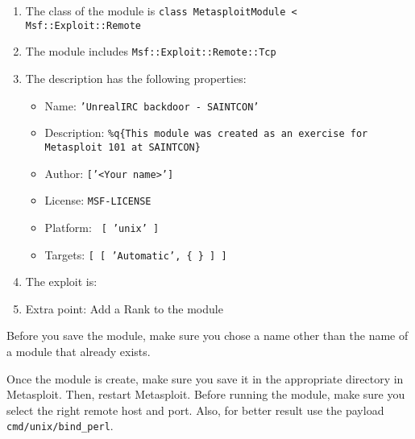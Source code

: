\begin{enumerate}
    \item The class of the module is \texttt{class MetasploitModule < Msf::Exploit::Remote}
    \item The module includes \texttt{Msf::Exploit::Remote::Tcp}
    \item The description has the following properties: 
        \begin{itemize}
            \item Name: \texttt{'UnrealIRC backdoor - SAINTCON'}
            \item Description: \texttt{\%q\{This module was created as an exercise for Metasploit 101 at SAINTCON\}}
            \item Author: \texttt{['<Your name>']}
            \item License: \texttt{MSF-LICENSE}
            \item Platform: \texttt{ [ 'unix' ]}
            \item Targets: \texttt{[ [ 'Automatic', \{ \} ] ]}
        \end{itemize}
    \item The exploit is: 
        \begin{listingbox}
            
        \end{listingbox}
    \item Extra point: Add a Rank to the module
\end{enumerate}

\begin{warnbox}[frametitle=Warning: Saving the module]
    Before you save the module, make sure you chose a name other than the name of a module that already exists.
\end{warnbox}

Once the module is create, make sure you save it in the appropriate directory in Metasploit. Then, restart Metasploit. Before running the module, make sure you select the right remote host and port. Also, for better result use the payload \texttt{cmd/unix/bind\_perl}.